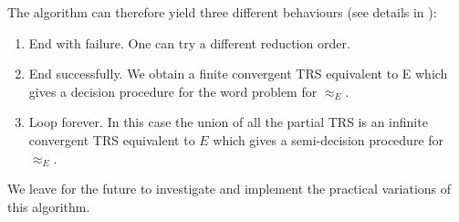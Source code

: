 The algorithm can therefore yield three different behaviours (see details in \cite{term-rewriting}):

\begin{enumerate}
\item End with failure. One can try a different reduction order. 
\item End successfully. We obtain a finite convergent TRS equivalent to E which gives a decision procedure for the word problem for $\approx_E$. 
\item Loop forever. In this case the union of all the partial TRS is an infinite convergent TRS equivalent to $E$ which gives a semi-decision procedure for $\approx_E$.
\end{enumerate}

We leave for the future to investigate and implement the practical variations of this algorithm.







